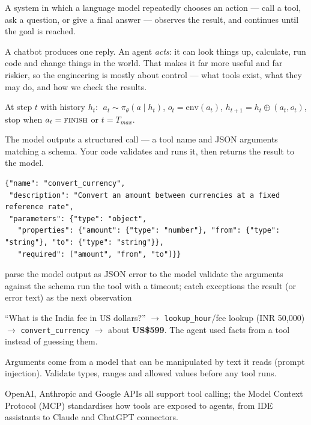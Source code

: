 \documentclass[11pt,a4paper]{article}
\begin{document}
\begin{bdef}[Agent]
A system in which a language model repeatedly chooses an action --- call a tool, ask a question, or give a final answer --- observes the result, and continues until the goal is reached.
\end{bdef}
A chatbot produces one reply. An agent \emph{acts}: it can look things up, calculate, run code and change things in the world. That makes it far more useful and far riskier, so the engineering is mostly about control --- what tools exist, what they may do, and how we check the results.
\begin{bmath}
At step $t$ with history $h_t$: $\;a_t\sim\pi_\theta(a\mid h_t)$, \;$o_t=\mathrm{env}(a_t)$, \;$h_{t+1}=h_t\oplus(a_t,o_t)$, \;stop when $a_t=\textsc{finish}$ or $t=T_{max}$.
\end{bmath}
\begin{bdef}
The model outputs a structured call --- a tool name and JSON arguments matching a schema. Your code validates and runs it, then returns the result to the model.
\end{bdef}
\begin{bcode}
\begin{lstlisting}
{"name": "convert_currency",
 "description": "Convert an amount between currencies at a fixed reference rate",
 "parameters": {"type": "object",
   "properties": {"amount": {"type": "number"}, "from": {"type": "string"}, "to": {"type": "string"}},
   "required": ["amount", "from", "to"]}}
\end{lstlisting}
\end{bcode}
\begin{balgo}
\begin{algorithmic}[1]
\State parse the model output as JSON
 \State \Return error to the model \EndIf
\State validate the arguments against the schema
\State run the tool with a timeout; catch exceptions
\State \Return the result (or error text) as the next observation
\end{algorithmic}
\end{balgo}
\begin{bres}
``What is the India fee in US dollars?'' $\rightarrow$ \texttt{lookup\_hour}/fee lookup (INR 50,000) $\rightarrow$ \texttt{convert\_currency} $\rightarrow$ about \textbf{US\$599}. The agent used facts from a tool instead of guessing them.
\end{bres}
\begin{bwarn}
Arguments come from a model that can be manipulated by text it reads (prompt injection). Validate types, ranges and allowed values before any tool runs.
\end{bwarn}
\begin{bapp}
OpenAI, Anthropic and Google APIs all support tool calling; the Model Context Protocol (MCP) standardises how tools are exposed to agents, from IDE assistants to Claude and ChatGPT connectors.
\end{bapp}
\end{document}

